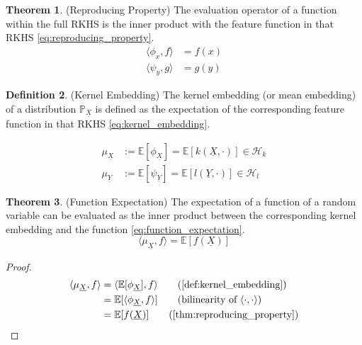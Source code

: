 \documentclass[twoside]{article} \usepackage{aistats2017}
\theoremstyle{definition}
\newtheorem{theorem}{Theorem}[section]
\newtheorem{definition}[theorem]{Definition}
\newcommand{\rv}[1]{\underline{#1}}
\newcommand{\expect}[1]{{\mathbb{E}[#1]}}
\newcommand{\inner}[2]{{\langle #1, #2 \rangle}}
\newcommand{\Hk}{\mathcal{H}_{k}}
\newcommand{\Hl}{\mathcal{H}_{l}}
\newcommand{\muX}{\mu_{\rv{X}}}
\newcommand{\muY}{\mu_{\rv{Y}}}
\newcommand{\phiX}{\phi_{\rv{X}}}
\newcommand{\psiY}{\psi_{\rv{Y}}}
\begin{document}
	\begin{theorem} \label{thm:reproducing_property}
		(Reproducing Property)
		The evaluation operator of a function within the full RKHS is the inner product with the feature function in that RKHS \eqref{eq:reproducing_property}.
		\begin{equation}
		\begin{aligned}
			\inner{\phi_{x}}{f} &= f(x) \\
			\inner{\psi_{y}}{g} &= g(y)
		\label{eq:reproducing_property}
		\end{aligned}
		\end{equation}	
	\end{theorem}

	\begin{definition} \label{def:kernel_embedding}
		(Kernel Embedding)
		The kernel embedding (or mean embedding) of a distribution $\mathbb{P}_{\rv{X}}$ is defined as the expectation of the corresponding feature function in that RKHS \eqref{eq:kernel_embedding}.
		
		\begin{equation}
		\begin{aligned}
			\muX &:= \expect{\phiX} = \expect{k(\rv{X}, \cdot)} \in \Hk \\
			\muY &:= \expect{\psiY} = \expect{l(\rv{Y}, \cdot)} \in \Hl
		\label{eq:kernel_embedding}
		\end{aligned}
		\end{equation}	
	\end{definition}

	\begin{theorem} \label{thm:function_expectation}
		(Function Expectation)
		The expectation of a function of a random variable can be evaluated as the inner product between the corresponding kernel embedding and the function \eqref{eq:function_expectation}.
		\begin{equation}
			\inner{\muX}{f} = \expect{f(\rv{X})}
			\label{eq:function_expectation}
		\end{equation}
		
		\begin{proof}
			\begin{align*}
				\inner{\muX}{f} &= \inner{\expect{\phiX}}{f} \tag{\cref{def:kernel_embedding}} \\
				&= \expect{\inner{\phiX}{f}} \tag{bilinearity of $\inner{\cdot}{\cdot}$} \\
				&= \expect{f(\rv{X})} \tag{\cref{thm:reproducing_property}}
			\end{align*}
		\end{proof}
	\end{theorem}
	
\end{document}
